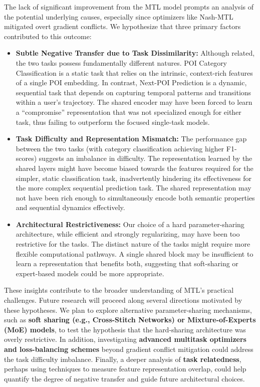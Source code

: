 The lack of significant improvement from the MTL model prompts an analysis of the potential underlying causes, especially since optimizers like Nash-MTL mitigated overt gradient conflicts. We hypothesize that three primary factors contributed to this outcome:
\begin{itemize}
    \item \textbf{Subtle Negative Transfer due to Task Dissimilarity:} Although related, the two tasks possess fundamentally different natures. POI Category Classification is a static task that relies on the intrinsic, context-rich features of a single POI embedding. In contrast, Next-POI Prediction is a dynamic, sequential task that depends on capturing temporal patterns and transitions within a user's trajectory. The shared encoder may have been forced to learn a ``compromise'' representation that was not specialized enough for either task, thus failing to outperform the focused single-task models.
    \item \textbf{Task Difficulty and Representation Mismatch:} The performance gap between the two tasks (with category classification achieving higher F1-scores) suggests an imbalance in difficulty. The representation learned by the shared layers might have become biased towards the features required for the simpler, static classification task, inadvertently hindering its effectiveness for the more complex sequential prediction task. The shared representation may not have been rich enough to simultaneously encode both semantic properties and sequential dynamics effectively.
    \item \textbf{Architectural Restrictiveness:} Our choice of a hard parameter-sharing architecture, while efficient and strongly regularizing, may have been too restrictive for the tasks. The distinct nature of the tasks might require more flexible computational pathways. A single shared block may be insufficient to learn a representation that benefits both, suggesting that soft-sharing or expert-based models could be more appropriate.
\end{itemize}

These insights contribute to the broader understanding of MTL's practical challenges. Future research will proceed along several directions motivated by these hypotheses. We plan to explore alternative parameter-sharing mechanisms, such as \textbf{soft sharing (e.g., Cross-Stitch Networks) or Mixture-of-Experts (MoE) models}, to test the hypothesis that the hard-sharing architecture was overly restrictive. In addition, investigating \textbf{advanced multitask optimizers and loss-balancing schemes} beyond gradient conflict mitigation could address the task difficulty imbalance. Finally, a deeper analysis of \textbf{task relatedness}, perhaps using techniques to measure feature representation overlap, could help quantify the degree of negative transfer and guide future architectural choices.
